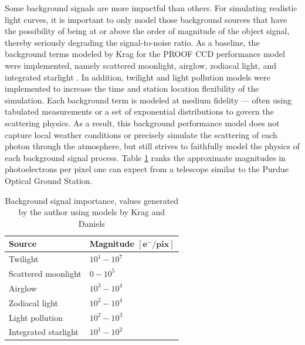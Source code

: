 Some background signals are more impactful than others. For simulating realistic light curves, it is important to only model those background sources that have the possibility of being at or above the order of magnitude of the object signal, thereby seriously degrading the signal-to-noise ratio. As a baseline, the background terms modeled by Krag for the PROOF CCD performance model were implemented, namely scattered moonlight, airglow, zodiacal light, and integrated starlight \cite{krag2003}. In addition, twilight and light pollution models were implemented to increase the time and station location flexibility of the simulation. Each background term is modeled at medium fidelity --- often using tabulated measurements or a set of exponential distributions to govern the scattering physics. As a result, this background performance model does not capture local weather conditions or precisely simulate the scattering of each photon through the atmosphere, but still strives to faithfully model the physics of each background signal process. Table \ref{tb:signal_importance} ranks the approximate magnitudes in photoelectrons per pixel one can expect from a telescope similar to the Purdue Optical Ground Station.

\begin{table}[]
  \centering
  \caption{Background signal importance, values generated by the author using models by Krag and Daniels \cite{krag2003, daniels1977}}
  \vspace*{6pt}
  \begin{tabular}{|l|l|}
  \hline
  \textbf{Source} & \textbf{Magnitude} $\mathbf{\left[ e^- / \textbf{pix}\right]}$ \\ \hline
  Twilight               & $10^1 - 10^7$                              \\ \hline
  Scattered moonlight    & $0 - 10^5$                                 \\ \hline
  Airglow                & $10^3 - 10^4$                              \\ \hline
  Zodiacal light         & $10^2 - 10^4$                              \\ \hline
  Light pollution        & $10^2 - 10^3$                              \\ \hline
  Integrated starlight   & $10^1 - 10^2$                              \\ \hline
  \end{tabular}
  \label{tb:signal_importance}
\end{table}

